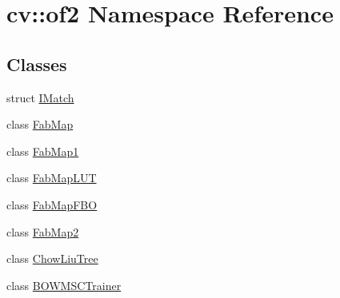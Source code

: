 \hypertarget{namespacecv_1_1of2}{\section{cv\-:\-:of2 Namespace Reference}
\label{namespacecv_1_1of2}
}
\subsection*{Classes}
\begin{DoxyCompactItemize}
\item 
struct \hyperlink{structcv_1_1of2_1_1IMatch}{I\-Match}
\item 
class \hyperlink{classcv_1_1of2_1_1FabMap}{Fab\-Map}
\item 
class \hyperlink{classcv_1_1of2_1_1FabMap1}{Fab\-Map1}
\item 
class \hyperlink{classcv_1_1of2_1_1FabMapLUT}{Fab\-Map\-L\-U\-T}
\item 
class \hyperlink{classcv_1_1of2_1_1FabMapFBO}{Fab\-Map\-F\-B\-O}
\item 
class \hyperlink{classcv_1_1of2_1_1FabMap2}{Fab\-Map2}
\item 
class \hyperlink{classcv_1_1of2_1_1ChowLiuTree}{Chow\-Liu\-Tree}
\item 
class \hyperlink{classcv_1_1of2_1_1BOWMSCTrainer}{B\-O\-W\-M\-S\-C\-Trainer}
\end{DoxyCompactItemize}
